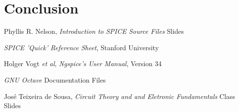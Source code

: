 \clearpage
\section{Conclusion}
\label{sec:conclusion}



\begin{thebibliography}{}

Phyllis R. Nelson, \emph{Introduction to SPICE Source Files} Slides

\emph{SPICE 'Quick' Reference Sheet}, Stanford University

Holger Vogt \textit{et al}, \emph{Ngspice's User Manual}, Version 34

\emph{GNU Octave} Documentation Files 

José Teixeira de Sousa, \emph{Circuit Theory and and Eletronic Fundamentals} Class Slides

\end{thebibliography}